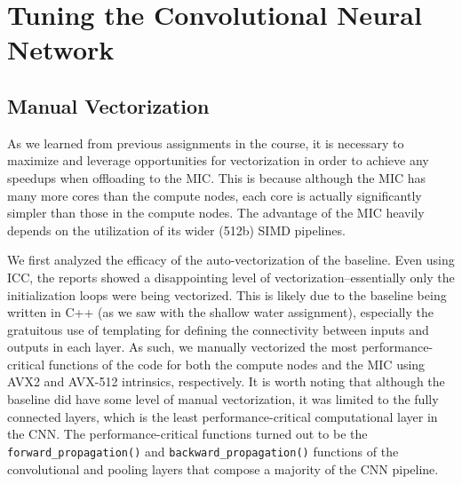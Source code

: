
\section{Tuning the Convolutional Neural Network}
\label{sec-tuning}

\subsection{Manual Vectorization}
\label{sec-tuning-vectorization}






As we learned from previous assignments in the course, it is necessary to
maximize and leverage opportunities for vectorization in order to achieve
any speedups when offloading to the MIC. This is because although the MIC
has many more cores than the compute nodes, each core is actually
significantly simpler than those in the compute nodes. The advantage of
the MIC heavily depends on the utilization of its wider (512b) SIMD
pipelines.

We first analyzed the efficacy of the auto-vectorization of the
baseline. Even using ICC, the reports showed a disappointing level of
vectorization--essentially only the initialization loops were being
vectorized. This is likely due to the baseline being written in C++ (as
we saw with the shallow water assignment), especially the gratuitous use
of templating for defining the connectivity between inputs and outputs in
each layer. As such, we manually vectorized the most performance-critical
functions of the code for both the compute nodes and the MIC using AVX2
and AVX-512 intrinsics, respectively. It is worth noting that although
the baseline did have some level of manual vectorization, it was limited
to the fully connected layers, which is the least performance-critical
computational layer in the CNN. The performance-critical functions turned
out to be the \texttt{forward\_propagation()} and
\texttt{backward\_propagation()} functions of the convolutional and
pooling layers that compose a majority of the CNN pipeline.

